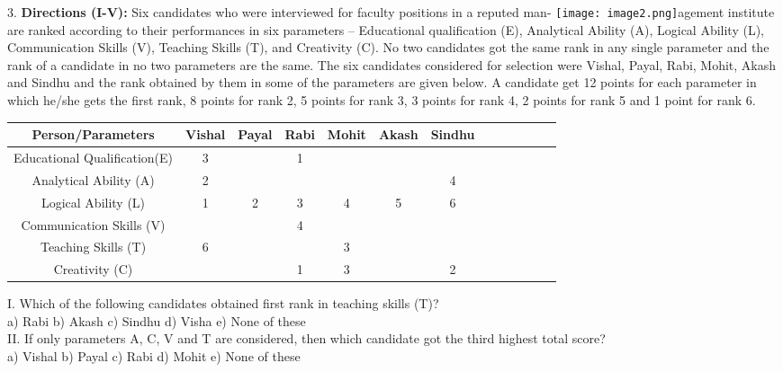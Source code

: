 \documentclass[
]{article}
\begin{document}
3. \textbf{Directions (I-V):} Six candidates who were interviewed for faculty positions in a reputed
man- \texttt{[image: image2.png]}agement institute are ranked according to their performances in six parameters –
Educational qualification (E), Analytical Ability (A), Logical Ability (L), Communication
Skills (V), Teaching Skills (T), and Creativity (C). No two candidates got the same rank in
any single parameter and the rank of a candidate in no two parameters are the same. The six
candidates considered for selection were Vishal, Payal, Rabi, Mohit, Akash and Sindhu and
the rank obtained by them in some of the parameters are given below. A candidate get 12
points for each parameter in which he/she gets the first rank, 8 points for rank 2, 5 points for
rank 3, 3 points for rank 4, 2 points for rank 5 and 1 point for rank 6.\\

\begin{tabular}{|c|c|c|c|c|c|c|c|c|c|c|c|c|}
\hline
Person/Parameters &Vishal &Payal &Rabi &Mohit &Akash &Sindhu\\ 
\hline
Educational Qualification(E) &3 & & 1 & & & \\
\hline
Analytical Ability (A) &2 & & & & & 4\\
\hline
Logical Ability (L) &1 &2 &3 &4 &5 &6\\
\hline
Communication Skills (V) & & & 4 & & & \\
\hline
Teaching Skills (T) &6 & & & 3 & & \\
\hline
Creativity (C) & & & 1 & 3 & & 2\\
\hline
\end{tabular}

I. Which of the following candidates obtained first rank in teaching skills (T)?\\
a) Rabi \hspace{2mm}b) Akash \hspace{2mm}c) Sindhu \hspace{2mm}d) Visha \hspace{2mm}e) None of these\\

II. If only parameters A, C, V and T are considered, then which candidate got the third
highest total score?\\
a) Vishal \hspace{2mm}b) Payal \hspace{2mm}c) Rabi \hspace{2mm}d) Mohit \hspace{2mm}e) None of these\\
\end{document}
